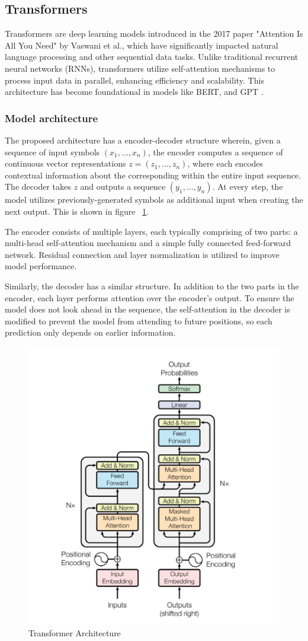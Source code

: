 \documentclass[licencjacka,en]{pracamgr}
\begin{document}
\subsection{Transformers}
Transformers are deep learning models introduced in the 2017 paper "Attention Is All You Need" by Vaswani et al., which have significantly impacted natural language processing and other sequential data tasks. Unlike traditional recurrent neural networks (RNNs), transformers utilize self-attention mechanisms to process input data in parallel, enhancing efficiency and scalability. This architecture has become foundational in models like BERT, and GPT \cite{medium_t}.
\subsubsection{Model architecture}
The proposed architecture has a encoder-decoder structure wherein, given a sequence of input symbols $ (x_1, … , x_n) $, the encoder computes a sequence of continuous vector representations $ z = (z_1, … , z_n) $, where each encodes contextual information about the corresponding within the entire input sequence. The decoder takes $ z $ and outputs a sequence $ (y_1, … , y_n) $. At every step, the model utilizes previously-generated symbols as additional input when creating the next output. This is shown in figure ~\ref{fig:transformers_fig}.

The encoder consists of multiple layers, each typically comprising of two parts: a multi-head self-attention mechanism and a simple fully connected feed-forward network. Residual connection and layer normalization is utilized to improve model performance.

Similarly, the decoder has a similar structure. In addition to the two parts in the encoder, each layer performs attention over the encoder’s output. To ensure the model does not look ahead in the sequence, the self-attention in the decoder is modified to prevent the model from attending to future positions, so each prediction only depends on earlier information.

\begin{figure}
    \centering
    \includegraphics[width=0.5\linewidth]{bachelor_images/transformer_arch.png}
    \caption{Transformer Architecture \cite{attention}}
    \label{fig:transformers_fig}
\end{figure}
\end{document}

